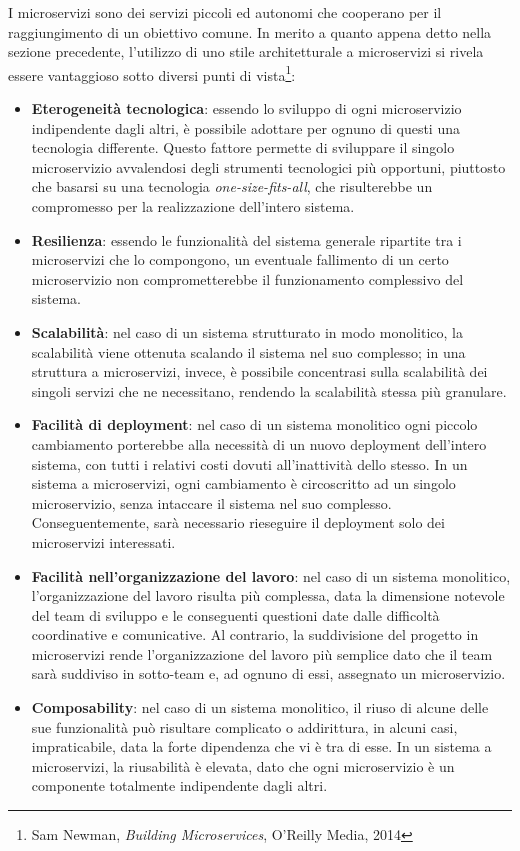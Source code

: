 \documentclass[a4paper,12pt]{report}
\begin{document}
I microservizi sono dei servizi piccoli ed autonomi che cooperano per il raggiungimento di un obiettivo comune. In merito a quanto appena detto nella sezione precedente, l'utilizzo di uno stile architetturale a microservizi si rivela essere vantaggioso sotto diversi punti di vista\footnote{Sam Newman, {\em Building Microservices}, O'Reilly Media, 2014}:
\begin{itemize}
	\item \textbf{Eterogeneità tecnologica}: essendo lo sviluppo di ogni microservizio indipendente dagli altri, è possibile adottare per ognuno di questi una tecnologia differente. Questo fattore permette di sviluppare il singolo microservizio avvalendosi degli strumenti tecnologici più opportuni, piuttosto che basarsi su una tecnologia \emph{one-size-fits-all}, che risulterebbe un compromesso per la realizzazione dell'intero sistema.
	\item \textbf{Resilienza}: essendo le funzionalità del sistema generale ripartite tra i microservizi che lo compongono, un eventuale fallimento di un certo microservizio non comprometterebbe il funzionamento complessivo del sistema.
	\item \textbf{Scalabilità}: nel caso di un sistema strutturato in modo monolitico, la scalabilità viene ottenuta scalando il sistema nel suo complesso; in una struttura a microservizi, invece, è possibile concentrasi sulla scalabilità dei singoli servizi che ne necessitano, rendendo la scalabilità stessa più granulare.
	\item \textbf{Facilità di deployment}: nel caso di un sistema monolitico ogni piccolo cambiamento porterebbe alla necessità di un nuovo deployment dell'intero sistema, con tutti i relativi costi dovuti all'inattività dello stesso. In un sistema a microservizi, ogni cambiamento è circoscritto ad un singolo microservizio, senza intaccare il sistema nel suo complesso. Conseguentemente, sarà necessario rieseguire il deployment solo dei microservizi interessati.
	\item \textbf{Facilità nell'organizzazione del lavoro}: nel caso di un sistema monolitico, l'organizzazione del lavoro risulta più complessa, data la dimensione notevole del team di sviluppo e le conseguenti questioni date dalle difficoltà coordinative e comunicative. Al contrario, la suddivisione del progetto in microservizi rende l'organizzazione del lavoro più semplice dato che il team sarà suddiviso in sotto-team e, ad ognuno di essi, assegnato un microservizio.
	\item \textbf{Composability}: nel caso di un sistema monolitico, il riuso di alcune delle sue funzionalità può risultare complicato o addirittura, in alcuni casi, impraticabile, data la forte dipendenza che vi è tra di esse. In un sistema a microservizi, la riusabilità è elevata, dato che ogni microservizio è un componente totalmente indipendente dagli altri.

\end{itemize}
\end{document}

